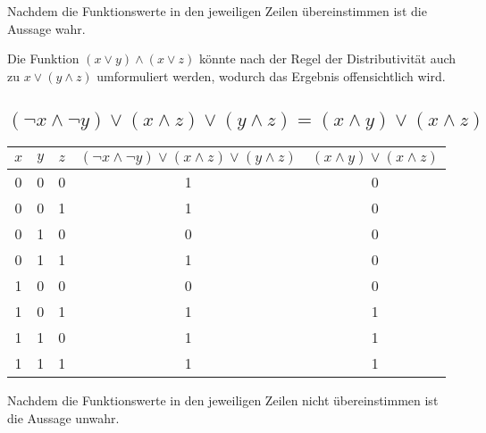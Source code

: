 \documentclass{article}
\begin{document}
\vspace{10px}

Nachdem die Funktionswerte in den jeweiligen Zeilen übereinstimmen ist die Aussage wahr.

Die Funktion $(x \lor y) \land (x \lor z)$ könnte nach der Regel der Distributivität auch zu ${x \lor (y \land z)}$ umformuliert werden, wodurch das Ergebnis offensichtlich wird.

\subsection{$(\neg{x} \land \neg{y}) \lor (x \land z) \lor (y \land z) = (x \land y) \lor (x \land z)$}

\begin{center}
\begin{tabular}{c | c | c || c | c}
    $x$ & $y$ & $z$ & $(\neg{x} \land \neg{y}) \lor (x \land z) \lor (y \land z)$ & $(x \land y) \lor (x \land z)$\\
    \hline
    0 & 0 & 0 & 1 & 0\\
    0 & 0 & 1 & 1 & 0\\
    0 & 1 & 0 & 0 & 0\\
    0 & 1 & 1 & 1 & 0\\
    1 & 0 & 0 & 0 & 0\\
    1 & 0 & 1 & 1 & 1\\
    1 & 1 & 0 & 1 & 1\\
    1 & 1 & 1 & 1 & 1
\end{tabular}
\end{center}

\vspace{10px}

Nachdem die Funktionswerte in den jeweiligen Zeilen nicht übereinstimmen ist die Aussage unwahr.
\end{document}
